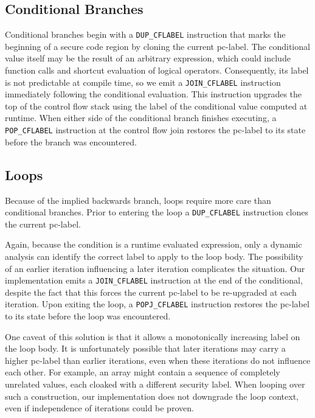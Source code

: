 \subsection{Conditional Branches}
Conditional branches begin with a \texttt{DUP\_CFLABEL} instruction that marks the beginning of a secure code region by cloning the current pc-label.
The conditional value itself may be the result of an arbitrary expression, which could include function calls and shortcut evaluation of logical operators.
Consequently, its label is not predictable at compile time, so we emit a \texttt{JOIN\_CFLABEL} instruction immediately following the conditional evaluation.
This instruction upgrades the top of the control flow stack using the label of the conditional value computed at runtime.
When either side of the conditional branch finishes executing, a \texttt{POP\_CFLABEL} instruction at the control flow join restores the pc-label to its state before the branch was encountered.

\subsection{Loops}

Because of the implied backwards branch, loops require more care than conditional branches.
Prior to entering the loop a \texttt{DUP\_CFLABEL} instruction clones the current pc-label.

Again, because the condition is a runtime evaluated expression, only a dynamic analysis can identify the correct label to apply to the loop body.
The possibility of an earlier iteration influencing a later iteration complicates the situation.
Our implementation emits a \texttt{JOIN\_CFLABEL} instruction at the end of the conditional, despite the fact that this forces the current pc-label to be re-upgraded at each iteration.
Upon exiting the loop, a \texttt{POPJ\_CFLABEL} instruction restores the pc-label to its state before the loop was encountered.

One caveat of this solution is that it allows a monotonically increasing label on the loop body.
It is unfortunately possible that later iterations may carry a higher pc-label than earlier iterations, even when these iterations do not influence each other.
For example, an array might contain a sequence of completely unrelated values, each cloaked with a different security label.
When looping over such a construction, our implementation does not downgrade the loop context, even if independence of iterations could be proven.

